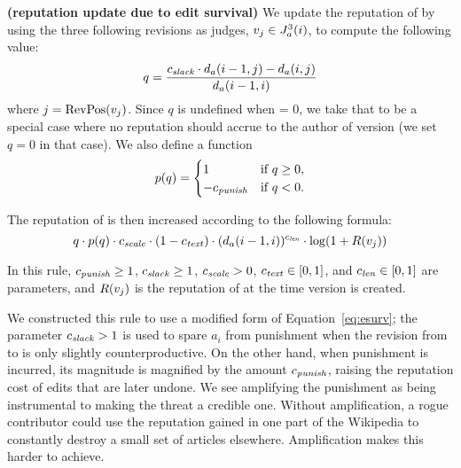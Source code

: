 \begin{regola}
\textbf{(reputation update due to edit survival)}
\label{rule-edit}
  We update the reputation of  by
  using the three following revisions as judges,
  $v_j \in J_{a}^{3}(i)$, to compute the following value:
\begin{equation*}
q = \frac{\slack \cdot \dist{a}{i-1,j} - \dist{a}{i,j}}
                        {\dist{a}{i-1,i}}
\label{eq-edit-long}
\end{equation*}
where $j = \mathrm{RevPos}(v_{j})$.
Since $q$ is undefined when  = 0,
we take that to be a special case where no reputation
should accrue to the author of version 
(\ie we set $q = 0$ in that case).
We also define a  function
\begin{equation*}
    p(q) =
        \begin{cases}
            1 & \text{if $q \ge 0$,} \\
            -{c_{{\text{\textit{punish}}}}} & \text{if $q < 0$.} \\
        \end{cases}
\end{equation*}

The reputation of  is then increased
according to the following formula:
\begin{equation*}
q \cdot p(q) 
  \cdot {c_{{\text{\textit{scale}}}}} \cdot (1 - {c_{{\text{\textit{text}}}}}) \cdot 
        (d_{a}(i-1,i))^{c_{{\text{\textit{len}}}}} \cdot \log(1 + R(v_{j}))
\end{equation*}

  In this rule, ${c_{{\text{\textit{punish}}}}} \geq 1$, ${c_{{\text{\textit{slack}}}}} \geq 1$, ${c_{{\text{\textit{scale}}}}} > 0$, 
  ${c_{{\text{\textit{text}}}}} \in [0,1]$, and ${c_{{\text{\textit{len}}}}} \in [0,1]$ are parameters,
  and $R(v_{j})$ is the reputation of 
  at the time version  is created.
\end{regola}

We constructed this rule to use a modified form of
Equation~\ref{eq:esurv};
the parameter ${c_{{\text{\textit{slack}}}}} > 1$ is used to spare $a_i$ from punishment when
the revision from  to  is only slightly
counterproductive.
On the other hand, when punishment is incurred, its magnitude is
magnified by the amount ${c_{{\text{\textit{punish}}}}}$, raising the reputation cost of
edits that are later undone. 
We see amplifying the punishment as being instrumental
to making the threat a credible one. 
Without amplification, a rogue contributor could use the reputation
gained in one part of the Wikipedia to constantly destroy a small set
of articles elsewhere.
Amplification makes this harder to achieve. 


